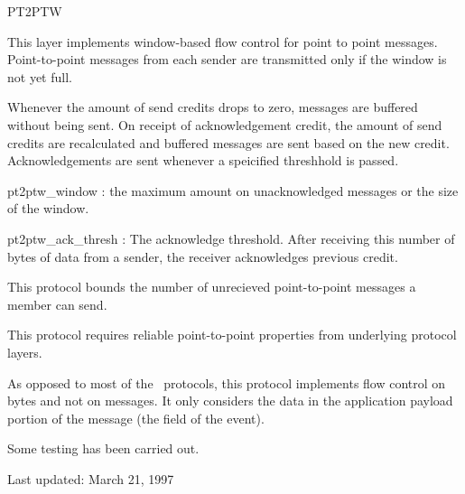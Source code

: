 \begin{Layer}{PT2PTW} 

This layer implements window-based flow control for point to point messages.
Point-to-point messages from each sender are transmitted only if the window is
not yet full.

\begin{Protocol}
Whenever the amount of send credits drops to zero, messages are buffered
without being sent.  On receipt of acknowledgement credit, the amount of send
credits are recalculated and buffered messages are sent based on the new
credit.  Acknowledgements are sent whenever a speicified threshhold is passed.
\end{Protocol}

\begin{Parameters}
\item pt2ptw\_window : the maximum amount on unacknowledged messages or the size of the
window.
\item pt2ptw\_ack\_thresh : The acknowledge threshold.  After receiving this
number of bytes of data from a sender, the receiver acknowledges previous
credit.
\end{Parameters}

\begin{Properties}
\item
This protocol bounds the number of unrecieved point-to-point messages a member
can send.
\item
This protocol requires reliable point-to-point properties from underlying
protocol layers.
\end{Properties}

\begin{Notes}
\item
As opposed to most of the \ensemble\ protocols, this protocol implements flow
control on bytes and not on messages.  It only considers the data in the
application payload portion of the message (the  field of the
event).
\end{Notes}

\begin{Sources}
\end{Sources}

\begin{Testing}
\item
Some testing has been carried out.
\end{Testing}

Last updated: March 21, 1997

\end{Layer}

